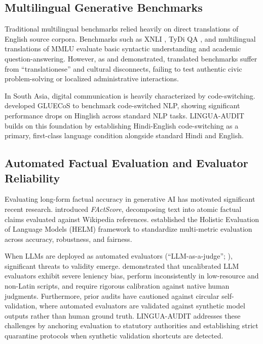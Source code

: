 \documentclass[11pt,a4paper]{article}
\begin{document}
\subsection{Multilingual Generative Benchmarks}
\label{sec:related_benchmarks}

Traditional multilingual benchmarks relied heavily on direct translations of English source corpora. Benchmarks such as XNLI \citep{conneau2018xnli}, TyDi QA \citep{clark2020tydi}, and multilingual translations of MMLU \citep{hendrycks2021measuring} evaluate basic syntactic understanding and academic question-answering. However, as \citet{ahuja2023mega} and \citet{bang2023multitask} demonstrated, translated benchmarks suffer from ``translationese'' and cultural disconnects, failing to test authentic civic problem-solving or localized administrative interactions.

In South Asia, digital communication is heavily characterized by code-switching. \citet{khanuja2020gluecos} developed GLUECoS to benchmark code-switched NLP, showing significant performance drops on Hinglish across standard NLP tasks. LINGUA-AUDIT builds on this foundation by establishing Hindi-English code-switching as a primary, first-class language condition alongside standard Hindi and English.

\subsection{Automated Factual Evaluation and Evaluator Reliability}
\label{sec:related_evaluation}

Evaluating long-form factual accuracy in generative AI has motivated significant recent research. \citet{min2023factscore} introduced \emph{FActScore}, decomposing text into atomic factual claims evaluated against Wikipedia references. \citet{liang2023holistic} established the Holistic Evaluation of Language Models (HELM) framework to standardize multi-metric evaluation across accuracy, robustness, and fairness.

When LLMs are deployed as automated evaluators (``LLM-as-a-judge''; \citealt{zheng2023judging}), significant threats to validity emerge. \citet{hada2023large} demonstrated that uncalibrated LLM evaluators exhibit severe leniency bias, perform inconsistently in low-resource and non-Latin scripts, and require rigorous calibration against native human judgments. Furthermore, prior audits have cautioned against circular self-validation, where automated evaluators are validated against synthetic model outputs rather than human ground truth. LINGUA-AUDIT addresses these challenges by anchoring evaluation to statutory authorities and establishing strict quarantine protocols when synthetic validation shortcuts are detected.
\end{document}

